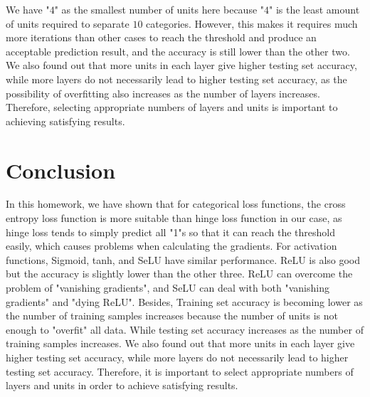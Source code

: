 \documentclass[UTF8,12pt]{article}
\begin{document}
	We have "$4$" as the smallest number of units here because "$4$" is the least amount of units required to separate $10$ categories. However, this makes it requires much more iterations than other cases to reach the threshold and produce an acceptable prediction result, and the accuracy is still lower than the other two. We also found out that more units in each layer give higher testing set accuracy, while more layers do not necessarily lead to higher testing set accuracy, as the possibility of overfitting also increases as the number of layers increases. Therefore, selecting appropriate numbers of layers and units is important to achieving satisfying results.
	
	\section{Conclusion}
	In this homework, we have shown that for categorical loss functions, the cross entropy loss function is more suitable than hinge loss function in our case, as hinge loss tends to simply predict all "1"s so that it can reach the threshold easily, which causes problems when calculating the gradients. For activation functions, Sigmoid, tanh, and SeLU have similar performance. ReLU is also good but the accuracy is slightly lower than the other three. ReLU can overcome the problem of "vanishing gradients", and SeLU can deal with both "vanishing gradients" and "dying ReLU". Besides, Training set accuracy is becoming lower as the number of training samples increases because the number of units is not enough to "overfit" all data. While testing set accuracy increases as the number of training samples increases. We also found out that more units in each layer give higher testing set accuracy, while more layers do not necessarily lead to higher testing set accuracy. Therefore, it is important to select appropriate numbers of layers and units in order to achieve satisfying results.
	
\end{document}
